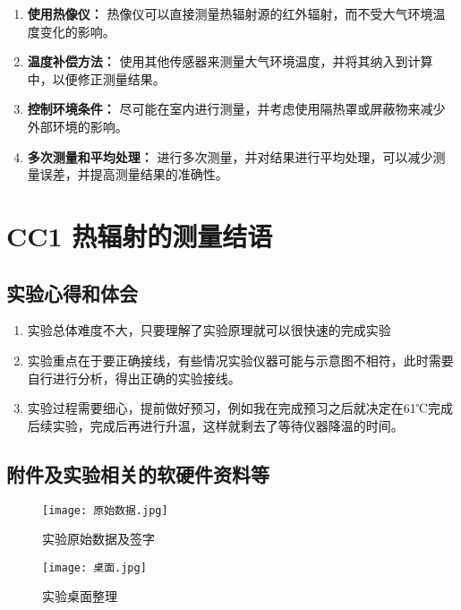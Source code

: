 \documentclass[dvipsnames, svgnames,a4paper,11pt]{article}
\begin{document}
	\begin{enumerate}
		\item \textbf{使用热像仪：} 热像仪可以直接测量热辐射源的红外辐射，而不受大气环境温度变化的影响。
	  
		\item \textbf{温度补偿方法：} 使用其他传感器来测量大气环境温度，并将其纳入到计算中，以便修正测量结果。
	  
		\item \textbf{控制环境条件：} 尽可能在室内进行测量，并考虑使用隔热罩或屏蔽物来减少外部环境的影响。
	  
		\item \textbf{多次测量和平均处理：} 进行多次测量，并对结果进行平均处理，可以减少测量误差，并提高测量结果的准确性。
	  \end{enumerate}
	
	\clearpage
	
	\section{CC1 热辐射的测量\quad\heiti 结语}
	
	\subsection{实验心得和体会}
	\begin{enumerate}
		\item 实验总体难度不大，只要理解了实验原理就可以很快速的完成实验
		\item 实验重点在于要正确接线，有些情况实验仪器可能与示意图不相符，此时需要自行进行分析，得出正确的实验接线。
		\item 实验过程需要细心，提前做好预习，例如我在完成预习之后就决定在61℃完成后续实验，完成后再进行升温，这样就剩去了等待仪器降温的时间。
	\end{enumerate}
	

	\subsection{附件及实验相关的软硬件资料等}
	
	\begin{figure}[{H}]
		\centering
		\texttt{[image: 原始数据.jpg]}
		\caption{实验原始数据及签字}
		\label{}
	\end{figure}
	\begin{figure}[{H}]
		\centering
		\texttt{[image: 桌面.jpg]}
		\caption{实验桌面整理}
		\label{}
	\end{figure}
\end{document}
